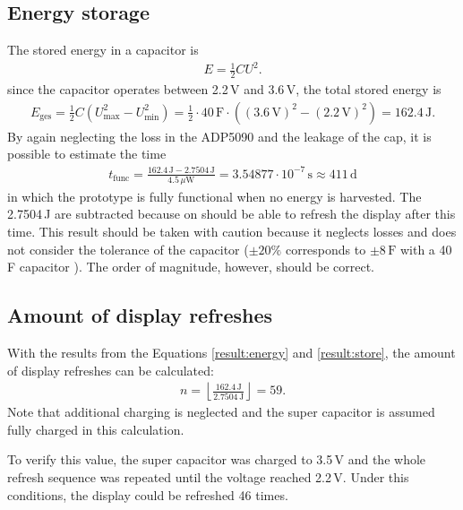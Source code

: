\subsection{Energy storage}
The stored energy in a capacitor is
\begin{align*}
	E =\frac{1}{2}CU^2.
\end{align*}
since the capacitor operates between 2.2\,V and 3.6\,V, the total stored energy is
\begin{align}
	E_{\text{ges}} = \frac{1}{2}C(U_{\text{max}}^2-U_{\text{min}}^2)=\frac{1}{2}\cdot 40\,\text {F}\cdot((3.6\,\text{V})^2-(2.2\,\text{V})^2)=162.4\,\text{J}\label{result:store}.
\end{align}
By again neglecting the loss in the ADP5090 and the leakage of the cap, it is possible to estimate the time
\begin{align}
	t_{\text{func}}=\frac{162.4\,\text{J}-2.7504\,\text{J}}{4.5\,\mu\text{W}}=3.54877\cdot 10^{-7}\,\text{s}\approx 411\,\text{d}
\end{align} 
in which the prototype is fully functional when no energy is harvested.
The 2.7504\,J are subtracted because on should be able to refresh the display after this time.
This result should be taken with caution because it neglects losses and does not consider the tolerance of the capacitor ($\pm20\%$ corresponds to $\pm8\,\text{F}$ with a 40\,F capacitor \cite{yuden}).
The order of magnitude, however, should be correct.

\subsection{Amount of display refreshes}
With the results from the Equations \eqref{result:energy} and \eqref{result:store}, the amount of display refreshes can be calculated:
\begin{align}
	n = \left\lfloor\frac{162.4\,\text{J}}{2.7504\,\text{J}}\right\rfloor=59.
\end{align}
Note that additional charging is neglected and the super capacitor is assumed fully charged in this calculation.

To verify this value, the super capacitor was charged to 3.5\,V and the whole refresh sequence was repeated until the voltage reached 2.2\,V.
Under this conditions, the display could be refreshed 46 times.
